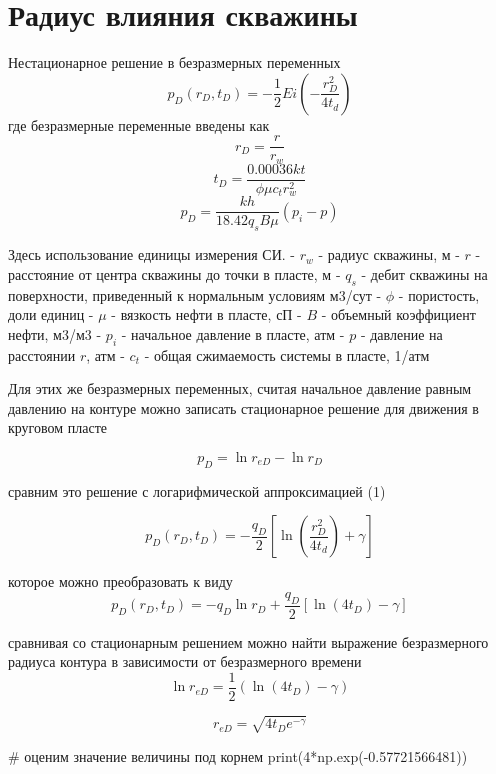 \documentclass[
  russian,
  letterpaper,
  DIV=11,
  numbers=noendperiod,
  oneside]{scrartcl}
\newenvironment{Shaded}{\begin{snugshade}}{\end{snugshade}}
\newcommand{\BuiltInTok}[1]{\textcolor[rgb]{0.00,0.23,0.31}{#1}}
\newcommand{\CommentTok}[1]{\textcolor[rgb]{0.37,0.37,0.37}{#1}}
\newcommand{\DecValTok}[1]{\textcolor[rgb]{0.68,0.00,0.00}{#1}}
\newcommand{\FloatTok}[1]{\textcolor[rgb]{0.68,0.00,0.00}{#1}}
\newcommand{\NormalTok}[1]{\textcolor[rgb]{0.00,0.23,0.31}{#1}}
\newcommand{\OperatorTok}[1]{\textcolor[rgb]{0.37,0.37,0.37}{#1}}
\begin{document}
\section{Радиус влияния
скважины}\label{ux440ux430ux434ux438ux443ux441-ux432ux43bux438ux44fux43dux438ux44f-ux441ux43aux432ux430ux436ux438ux43dux44b}

Нестационарное решение в безразмерных переменных \[ 
p_D(r_D,t_D) = - \frac{1}{2} Ei \left(- \dfrac{ r_D^2}{4t_d} \right)
\] где безразмерные переменные введены как \[ 
r_D = \frac{r}{r_w} 
\] \[ 
t_D = \frac{0.00036 kt}{\phi \mu c_t r_w^2} 
\] \[ 
p_D = \frac{kh}{ 18.42 q_s B \mu} \left( p_i - p \right) 
\]

Здесь использование единицы измерения СИ. - \(r_w\) - радиус скважины, м
- \(r\) - расстояние от центра скважины до точки в пласте, м - \(q_s\) -
дебит скважины на поверхности, приведенный к нормальным условиям м3/сут
- \(\phi\) - пористость, доли единиц - \(\mu\) - вязкость нефти в
пласте, сП - \(B\) - объемный коэффициент нефти, м3/м3 - \(p_i\) -
начальное давление в пласте, атм - \(p\) - давление на расстоянии \(r\),
атм - \(c_t\) - общая сжимаемость системы в пласте, 1/атм

Для этих же безразмерных переменных, считая начальное давление равным
давлению на контуре можно записать стационарное решение для движения в
круговом пласте

\[
p_D = \ln r_{eD} - \ln r_D 
\]

сравним это решение с логарифмической аппроксимацией (1)

\[
p_D(r_D,t_D) = - \frac{q_D}{2} \left[ \ln \left( \dfrac{ r_D^2}{4t_d} \right) +\gamma \right]
\]

которое можно преобразовать к виду \[
p_D(r_D,t_D) = - q_D \ln r_D  + \frac{q_D}{2} \left[ \ln(4t_D)   -\gamma \right]
\]

сравнивая со стационарным решением можно найти выражение безразмерного
радиуса контура в зависимости от безразмерного времени \[
\ln r_{eD} = \frac{1}{2}(\ln(4t_D)-\gamma) 
\]

\[
r_{eD} =  \sqrt { 4t_D e^{-\gamma} } 
\]

\begin{Shaded}
\begin{Highlighting}[]
\CommentTok{\# оценим значение величины под корнем}
\BuiltInTok{print}\NormalTok{(}\DecValTok{4}\OperatorTok{*}\NormalTok{np.exp(}\OperatorTok{{-}}\FloatTok{0.57721566481}\NormalTok{))}
\end{Highlighting}
\end{Shaded}
\end{document}
